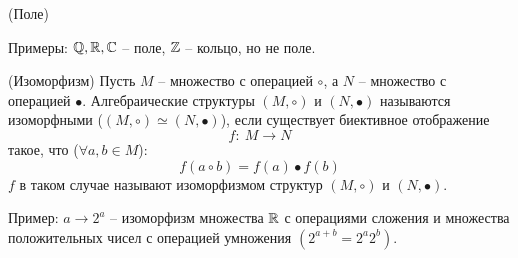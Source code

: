\begin{multicols}{2}
\begin{definition}{(Поле)}{}
\end{definition}
Примеры: $\mathbb{Q}, \mathbb{R}, \mathbb{C}$ -- поле, $\mathbb{Z}$ -- кольцо, но не поле.
\begin{definition}{(Изоморфизм)}{}
    Пусть $M$ -- множество с операцией $\circ$, а $N$ -- множество с операцией $\bullet$. Алгебраические структуры $(M, \circ)$ и $(N, \bullet)$ называются изоморфными ($(M, \circ) \simeq (N, \bullet)$), если существует биективное отображение\useshortskip \[
            f: \ M \to N
        \]
    такое, что ($\forall a,b \in M$):\useshortskip
    \[
        f(a\circ b) = f(a) \bullet f(b)
        \]
    $f$ в таком случае называют изоморфизмом структур $(M, \circ)$ и $(N, \bullet)$.
\end{definition}
Пример: $a \to 2^a$ -- изоморфизм множества $\mathbb{R}$ с операциями сложения и множества положительных чисел с операцией умножения $(2^{a+b} = 2^a2^b)$.
\bigskip
\par


\end{multicols}
